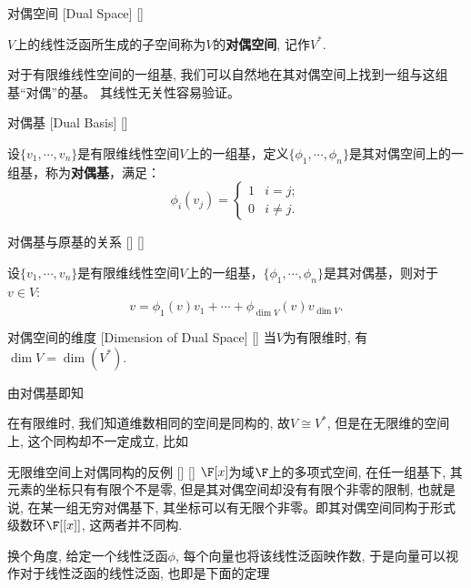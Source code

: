 \documentclass[UTF8]{ctexart}
\begin{document}
        
		\begin{dfn}
			[]
			{对偶空间}
			[Dual Space]
			[]

			$V$上的线性泛函所生成的子空间称为$V$的\textbf{对偶空间}, 记作$V^{*}$.
		\end{dfn}
		
        对于有限维线性空间的一组基, 我们可以自然地在其对偶空间上找到一组与这组基“对偶”的基。
        其线性无关性容易验证。
		\begin{dfn}
			[]
			{对偶基}
			[Dual Basis]
			[]

			设$\{v_1,\cdots,v_n\}$是有限维线性空间$V$上的一组基，定义$\{\phi_1,\cdots,\phi_n\}$是其对偶空间上的一组基，称为\textbf{对偶基}，满足：
			\[\phi_i(v_j)=\begin{cases}
				1 & i=j;\\
				0 & i\neq j.
			\end{cases}\]
		\end{dfn}
        

		\begin{ppt}
			[]
			{对偶基与原基的关系}
			[]
			[]

			设$\{v_1,\cdots,v_n\}$是有限维线性空间$V$上的一组基，$\{\phi_1,\cdots,\phi_n\}$是其对偶基，则对于$v\in V$:
			\[v=\phi_1(v)v_1+\cdots+\phi_{\dim V}(v)v_{\dim V}.\]
		\end{ppt}
        
        \begin{ppt}
			[]
			{对偶空间的维度}
			[Dimension of Dual Space]
			[]
                当$V$为有限维时, 有
			$\dim V=\dim(V^*)$.
		\end{ppt}
        
        \begin{prf}
                由对偶基即知
        \end{prf}
        在有限维时, 我们知道维数相同的空间是同构的, 故$V\cong V^*$, 但是在无限维的空间上, 这个同构却不一定成立, 比如
        \begin{cxmp}
            []
            {无限维空间上对偶同构的反例}
            []
            []
            $\F[x]$为域$\F$上的多项式空间, 在任一组基下, 其元素的坐标只有有限个不是零, 但是其对偶空间却没有有限个非零的限制, 也就是说, 在某一组无穷对偶基下, 其坐标可以有无限个非零。即其对偶空间同构于形式级数环$\F[[x]]$, 这两者并不同构.
        \end{cxmp}

        换个角度, 给定一个线性泛函$\phi$, 每个向量也将该线性泛函映作数, 于是向量可以视作对于线性泛函的线性泛函, 也即是下面的定理
\end{document}
